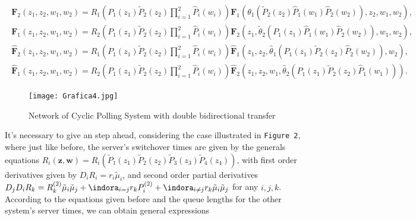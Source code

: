 \begin{eqnarray}\label{Recursive.Equations.First.Casse}
\begin{array}{r}
\mathbf{F}_{2}\left(z_{1},z_{2},w_{1},w_{2}\right)=R_{1}\left(P_{1}\left(z_{1}\right)\tilde{P}_{2}
\left(z_{2}\right)\prod_{i=1}^{2}
\hat{P}_{i}\left(w_{i}\right)\right)\mathbf{F}_{1}\left(\theta_{1}\left(\tilde{P}_{2}\left(z_{2}
\right)\hat{P}_{1}\left(w_{1}\right)\hat{P}_{2}\left(w_{2}\right)\right),z_{2},w_{1},w_{2}\right),\\
\mathbf{F}_{1}\left(z_{1},z_{2},w_{1},w_{2}\right)=R_{2}\left(P_{1}\left(z_{1}\right)\tilde{P}_{2}
\left(z_{2}\right)\prod_{i=1}^{2}
\hat{P}_{i}\left(w_{i}\right)\right)\mathbf{F}_{2}\left(z_{1},\tilde{\theta}_{2}\left(P_{1}\left(z_{1}\right)\hat{P}_{1}\left(w_{1}\right)\hat{P}_{2}\left(w_{2}
\right)\right),w_{1},w_{2}\right),\\
\hat{\mathbf{F}}_{2}\left(z_{1},z_{2},w_{1},w_{2}\right)=\hat{R}_{1}\left(P_{1}\left(z_{1}\right)\tilde{P}_{2}\left(z_{2}\right)\prod_{i=1}^{2}
\hat{P}_{i}\left(w_{i}\right)\right)\hat{\mathbf{F}}_{1}\left(z_{1},z_{2},\hat{\theta}_{1}\left(P_{1}\left(z_{1}\right)\tilde{P}_{2}\left(z_{2}\right)\hat{P}_{2}\left(w_{2}
\right)\right),w_{2}\right),\\
\hat{\mathbf{F}}_{1}\left(z_{1},z_{2},w_{1},w_{2}\right)=\hat{R}_{2}\left(P_{1}\left(z_{1}\right)\tilde{P}_{2}\left(z_{2}\right)\prod_{i=1}^{2}
\hat{P}_{i}\left(w_{i}\right)\right)\hat{\mathbf{F}}_{2}\left(z_{1},z_{2},w_{1},\hat{\theta}_{2}\left(P_{1}\left(z_{1}\right)\tilde{P}_{2}\left(z_{2}\right)\hat{P}_{1}\left(w_{1}
\right)\right)\right).
\end{array}
\end{eqnarray}


\begin{figure}[H]\caption{Network of Cyclic Polling System with double bidirectional transfer}
\centering
\texttt{[image: Grafica4.jpg]}
\end{figure}\label{FigureRSVC3}


It's necessary to give an step ahead, considering the case illustrated in \texttt{Figure 2}, where just like before, the server's switchover times are given by the generals equations
$R_{i}\left(\mathbf{z,w}\right)=R_{i}\left(\tilde{P}_{1}\left(z_{1}\right)
\tilde{P}_{2}\left(z_{2}\right)\tilde{P}_{3}\left(z_{3}\right)
\tilde{P}_{4}\left(z_{4}\right)\right)$, with first order derivatives given by $D_{i}R_{i}=r_{i}\tilde{\mu}_{i}$, and second order partial derivatives $D_{j}D_{i}R_{k}=R_{k}^{(2)}\tilde{\mu}_{i}\tilde{\mu}_{j}+\indora_{i=j}r_{k}P_{i}^{(2)}+\indora_{i\neq j}r_{k}\tilde{\mu}_{i}\tilde{\mu}_{j}$ for any $i,j,k$. According to the equations given before and the queue lengths for the other system's server times, we can obtain general expressions

